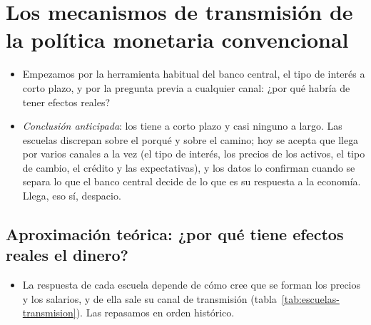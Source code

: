 \documentclass[11pt]{article}
\begin{document}
\section{Los mecanismos de transmisión\cortetitulo{} de la política monetaria convencional}\label{sec:convencional}

\begin{itemize}
\item Empezamos por la herramienta habitual del banco central, el tipo de interés a corto plazo, y por la pregunta previa a cualquier canal: ¿por qué habría de tener efectos reales?
\item \emph{Conclusión anticipada}: los tiene a corto plazo y casi ninguno a largo. Las escuelas discrepan sobre el porqué y sobre el camino; hoy se acepta que llega por varios canales a la vez (el tipo de interés, los precios de los activos, el tipo de cambio, el crédito y las expectativas), y los datos lo confirman cuando se separa lo que el banco central decide de lo que es su respuesta a la economía. Llega, eso sí, despacio.
\end{itemize}

\subsection{Aproximación teórica:\cortetitulo{} ¿por qué tiene efectos reales el dinero?}\label{sec:aproximacion}

\begin{itemize}
\item La respuesta de cada escuela depende de cómo cree que se forman los precios y los salarios, y de ella sale su canal de transmisión (tabla~\ref{tab:escuelas-transmision}). Las repasamos en orden histórico.
\end{itemize}
\end{document}
